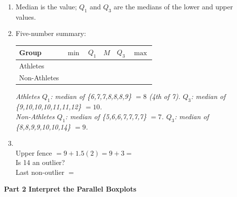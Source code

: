 \documentclass[10pt]{article}
\begin{document}
\begin{enumerate}[leftmargin=1.5em, itemsep=6pt]

  \item Median is the  value; $Q_1$ and $Q_3$ are the medians of
        the lower and upper  values.

  \item Five-number summary:\\[4pt]
        \renewcommand{\arraystretch}{1.6}
        \begin{tabularx}{\linewidth}{@{} l Y Y Y Y Y @{}}
        \textbf{Group} & $\min$ & $Q_1$ & $M$ & $Q_3$ & $\max$ \\
        \midrule
        Athletes      &  &  &  &  &  \\
        Non-Athletes  &  &  &  &   &  \\
        \end{tabularx}

        \vspace{4pt}
        {\small\textit{Athletes $Q_1$: median of \{6,7,7,8,8,8,9\} $= 8$ (4th of 7).
        $Q_3$: median of \{9,10,10,10,11,11,12\} $= 10$.\\
        Non-Athletes $Q_1$: median of \{5,6,6,7,7,7,7\} $= 7$.
        $Q_3$: median of \{8,8,9,9,10,10,14\} $= 9$.}}

  \item {}\\[4pt]
        Upper fence $= 9 + 1.5(2) = 9 + 3 = $ \\[3pt]
        Is 14 an outlier? \\[3pt]
        Last non-outlier $= $ 

\end{enumerate}

\vspace{0.10in}

{\large\bfseries\color{navy} Part 2 \quad Interpret the Parallel Boxplots}

\vspace{0.08in}
\end{document}
